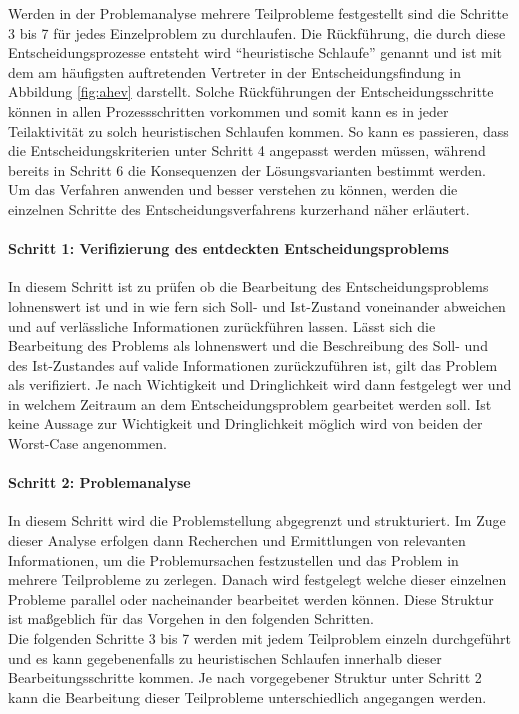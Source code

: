 Werden in der Problemanalyse mehrere Teilprobleme festgestellt sind die Schritte\,3 bis 7 für jedes Einzelproblem zu durchlaufen. Die Rückführung, die durch diese Entscheidungsprozesse entsteht wird "`heuristische Schlaufe"' genannt und ist mit dem am häufigsten auftretenden Vertreter in der Entscheidungsfindung in Abbildung \ref{fig:ahev} darstellt. Solche Rückführungen der Entscheidungsschritte können in allen Prozessschritten vorkommen und somit kann es in jeder Teilaktivität zu solch heuristischen Schlaufen kommen. So kann es passieren, dass die Entscheidungskriterien unter Schritt 4 angepasst werden müssen, während bereits in Schritt 6 die Konsequenzen der Lösungsvarianten bestimmt werden. Um das Verfahren anwenden und besser verstehen zu können, werden die einzelnen Schritte des Entscheidungsverfahrens kurzerhand näher erläutert. 
\vspace*{-2.5mm}
\paragraph{Schritt 1: Verifizierung des entdeckten Entscheidungsproblems} In diesem Schritt ist zu prüfen ob die Bearbeitung des Entscheidungsproblems lohnenswert ist und in wie fern sich Soll- und Ist-Zustand voneinander abweichen und auf verlässliche Informationen zurückführen lassen. Lässt sich die Bearbeitung des Problems als lohnenswert und die Beschreibung des Soll- und des Ist-Zustandes auf valide Informationen zurückzuführen ist, gilt das Problem als verifiziert. Je nach Wichtigkeit und Dringlichkeit wird dann festgelegt wer und in welchem Zeitraum an dem Entscheidungsproblem gearbeitet werden soll. Ist keine Aussage zur Wichtigkeit und Dringlichkeit möglich wird von beiden der Worst-Case angenommen.
\vspace*{-2.5mm}
\paragraph{Schritt 2: Problemanalyse} In diesem Schritt wird die Problemstellung abgegrenzt und strukturiert. Im Zuge dieser Analyse erfolgen dann Recherchen und Ermittlungen von relevanten Informationen, um die Problemursachen festzustellen und das Problem in mehrere Teilprobleme zu zerlegen. Danach wird festgelegt welche dieser einzelnen Probleme parallel oder nacheinander bearbeitet werden können. Diese Struktur ist maßgeblich für das Vorgehen in den folgenden Schritten.\\

Die folgenden Schritte 3 bis 7 werden mit jedem Teilproblem einzeln durchgeführt und es kann gegebenenfalls zu heuristischen Schlaufen innerhalb dieser Bearbeitungsschritte kommen. Je nach vorgegebener Struktur unter Schritt 2 kann die Bearbeitung dieser Teilprobleme unterschiedlich angegangen werden.
\vspace*{-2.5mm}
